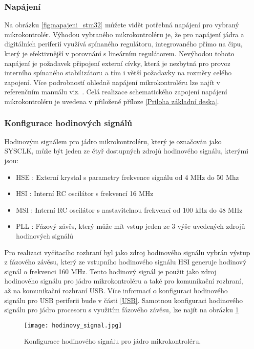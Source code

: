 	\subsubsection{Napájení}
	Na obrázku \ref{fig:napajeni_stm32} můžete vidět potřebná napájení pro vybraný mikrokontrolér. 
	Výhodou vybraného mikrokontroléru je, že pro napájení jádra a digitálních periferií využívá spínaného regulátoru, integrovaného přímo na čipu, který je efektivnější v porovnání s lineárním regulátorem. Nevýhodou tohoto napájení je požadavek připojení externí cívky, která je nezbytná pro provoz interního spínaného stabilizátoru a tím i větší požadavky na rozměry celého zapojení. Více podrobností ohledně napájení mikrokontroléru lze najít v referenčním manuálu viz. \cite{STM32U5A9_RM}. Celá realizace schematického zapojení napájení mikrokontroléru je uvedena v přiložené příloze \ref{Priloha základní deska}.
	
	\subsubsection{Konfigurace hodinových signálů} %
	Hodinovým signálem pro jádro mikrokontroléru, který je označován jako SYSCLK, může být jeden ze čtyř dostupných zdrojů hodinového signálu, kterými jsou:
	\begin{itemize}
		\setlength\itemsep{0.005em}
		\item HSE : Externí krystal s parametry frekvence signálu od 4 MHz do 50 Mhz
		\item HSI : Interní RC oscilátor s frekvencí 16 MHz
		\item MSI : Interní RC oscilátor s nastavitelnou frekvencí od 100 kHz do 48 MHz
		\item PLL : Fázový závěs, který může mít vstup jeden ze 3 výše uvedených zdrojů hodinových signálů
	\end{itemize}
	Pro realizaci vyčítacího rozhraní byl jako zdroj hodinového signálu vybrán výstup z fázového závěsu, který ze vstupního hodinového signálu HSI generuje hodinový signál o frekvenci 160 MHz. Tento hodinový signál je použit jako zdroj hodinového signálu pro jádro mikrokontroléru a také pro komunikační rozhraní, až na komunikační rozhraní USB. Více informací o konfiguraci hodinového signálu pro USB periferii bude v části \ref{USB}. Samotnou konfiguraci hodinového signálu pro jádro procesoru s využitím fázového závěsu, lze najít na obrázku \ref{fig:hodinovy_signal}
	\begin{figure}[h!]
		\centering
		\captionsetup{justification=centering}
		\texttt{[image: hodinovy\_signal.jpg]}
		\caption{Konfigurace hodinového signálu pro jádro mikrokontroléru.} 
		\label{fig:hodinovy_signal}
	\end{figure}

